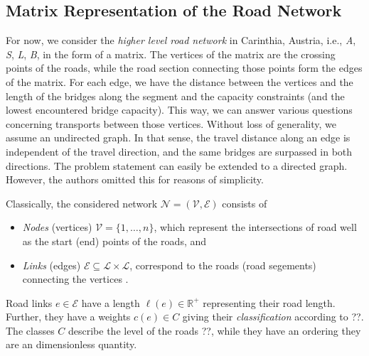 %
\subsection{Matrix Representation of the Road Network}

For now, we consider the \textit{higher level road network} in Carinthia, Austria,
i.e., \textit{A}, \textit{S}, \textit{L}, \textit{B}, in the  form of a matrix.
The vertices of the matrix are the crossing points of the roads, while
the road section connecting those points form the edges of the matrix.
For each edge, we have the distance between the vertices and the length of the bridges along the segment
and the capacity constraints (and the lowest encountered bridge capacity).
This way, we can answer various questions concerning transports between those vertices.
Without loss of generality, we assume an undirected graph.
In that sense, the travel distance along an edge is independent of
the travel direction, and  the same bridges are surpassed in both directions.
The problem statement can
easily be extended to a directed graph. However, the authors omitted this for reasons of simplicity.

Classically,  the considered network $\mathcal{N}=(\mathcal{V},\mathcal{E})$ consists of
\begin{itemize}
  \item \emph{Nodes} (vertices) $\mathcal{V}=\{1,\ldots, n\}$, which represent the intersections of road
  well as the start (end) points of the roads, and

  \item \emph{Links} (edges) $\mathcal{E} \subseteq \mathcal{L} \times \mathcal{L}$,
  correspond to the roads (road segements) connecting the vertices \cite{liedtke2012generation}.
\end{itemize}

Road links $e \in \mathcal{E}$ have a length $\ell(e)\in \mathbb{R}^{+}$ representing their road length.
Further, they have a weights $c(e) \in C$ giving their \emph{classification} according to {\color{red} ??}.
The classes $C$ describe the level of the roads {\color{red} ??},
while they have an ordering they are an dimensionless quantity.

